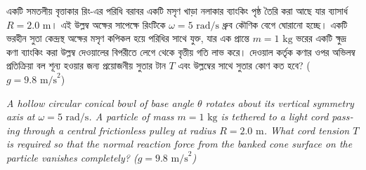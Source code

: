\documentclass[12pt, a4paper]{article}
\begin{document}
\newpage

\begin{tcolorbox}[questionbox={প্রশ্ন (Question) 22}]
    \noindent
    একটি সমতলীয় বৃত্তাকার রিং-এর পরিধি বরাবর একটি মসৃণ খাড়া নলাকার ব্যাংকিং পৃষ্ঠ তৈরি করা আছে যার ব্যাসার্ধ $R = 2.0\text{ m}$। এই উল্লম্ব অক্ষের সাপেক্ষে রিংটিকে $\omega = 5\text{ rad/s}$ ধ্রুব কৌণিক বেগে ঘোরানো হচ্ছে। একটি ভরহীন সুতা কেন্দ্রস্থ অক্ষের মসৃণ কপিকল হয়ে পরিধির সাথে যুক্ত, যার এক প্রান্তে $m = 1\text{ kg}$ ভরের একটি ক্ষুদ্র কণা ব্যাংকিং করা উল্লম্ব দেওয়ালের বিপরীতে লেগে থেকে বৃত্তীয় গতি লাভ করে। দেওয়াল কর্তৃক কণার ওপর অভিলম্ব প্রতিক্রিয়া বল শূন্য হওয়ার জন্য প্রয়োজনীয় সুতার টান $T$ এবং উল্লম্বের সাথে সুতার কোণ কত হবে? ($g = 9.8\text{ m/s}^2$)
    
    \vspace{0.8em}
    \begin{english}
    \noindent\textit{\color{darkgray}
    A hollow circular conical bowl of base angle $\theta$ rotates about its vertical symmetry axis at $\omega = 5\text{ rad/s}$. A particle of mass $m = 1\text{ kg}$ is tethered to a light cord passing through a central frictionless pulley at radius $R = 2.0\text{ m}$. What cord tension $T$ is required so that the normal reaction force from the banked cone surface on the particle vanishes completely? ($g = 9.8\text{ m/s}^2$)
    }
    \end{english}
\end{tcolorbox}

\vspace{1em}
\begin{center}
\end{center}
\vspace{1em}
\end{document}
